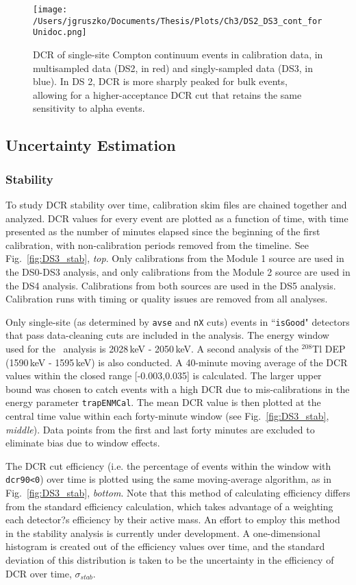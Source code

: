 \begin{figure}[h]
 \centering
 \texttt{[image: /Users/jgruszko/Documents/Thesis/Plots/Ch3/DS2\_DS3\_cont\_forUnidoc.png]}
 \caption[Comparison of DCR in singly-sampled and multi-sampled MJD data sets]{DCR of single-site Compton continuum events in calibration data, in multisampled data (DS2, in red) and singly-sampled data (DS3, in blue). In DS 2, DCR is more sharply peaked for bulk events, allowing for a higher-acceptance DCR cut that retains the same sensitivity to alpha events.} 
 \label{fig:DS2_DS3_comparison}
\end{figure}


\subsection{Uncertainty Estimation}
\subsubsection{Stability}
To study DCR stability over time, calibration skim files are chained together and analyzed.  DCR values for every event are plotted as a function of time, with time presented as the number of minutes elapsed since the beginning of the first calibration, with non-calibration periods removed from the timeline. See Fig.~\ref{fig:DS3_stab}, {\it top}. Only calibrations from the Module 1 source are used in the DS0-DS3 analysis, and only calibrations from the Module 2 source are used in the DS4 analysis.  Calibrations from both sources are used in the DS5 analysis. Calibration runs with timing or quality issues are removed from all analyses.  

Only single-site (as determined by {\tt avse} and {\tt nX} cuts) events in ``{\tt isGood}" detectors that pass data-cleaning cuts are included in the analysis. The energy window used for the \nonubb\ analysis is 2028\,keV - 2050\,keV. A second analysis of the $^{208}$Tl DEP (1590\,keV - 1595\,keV) is also conducted. A 40-minute moving average of the DCR values within the closed range [-0.003,0.035] is calculated. The larger upper bound was chosen to catch events with a high DCR due to mis-calibrations in the energy parameter {\tt trapENMCal}. The mean DCR value is then plotted at the central time value within each forty-minute window (see Fig.~\ref{fig:DS3_stab}, {\it middle}). Data points from the first and last forty minutes are excluded to eliminate bias due to window effects. 

The DCR cut efficiency (i.e.  the percentage of events within the window with {\tt dcr90<0}) over time is plotted using the same moving-average algorithm, as in Fig.~\ref{fig:DS3_stab}, {\it bottom}. Note that this method of calculating efficiency differs from the standard efficiency calculation, which takes advantage of a weighting each detector?s efficiency by their active mass.  An effort to employ this method in the stability analysis is currently under development. A one-dimensional histogram is created out of the efficiency values over time, and the standard deviation of this distribution is taken to be the uncertainty in the efficiency of DCR over time, $\sigma_{stab}$. 

